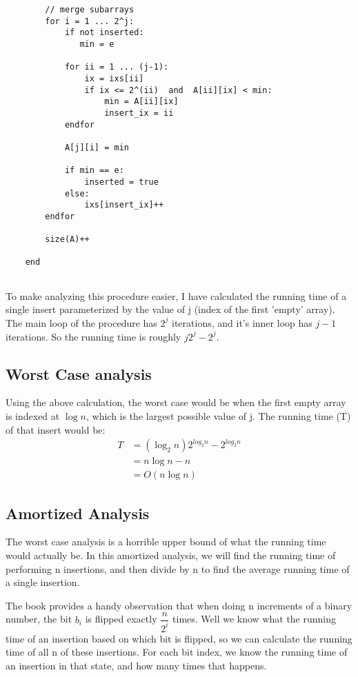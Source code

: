 \documentclass[a4paper,12pt]{article}
\begin{document}
\begin{enumerate}[a)]
\begin{verbatim}
        // merge subarrays 
        for i = 1 ... 2^j:
            if not inserted:
               min = e
           
            for ii = 1 ... (j-1):
                ix = ixs[ii] 
                if ix <= 2^(ii)  and  A[ii][ix] < min:
                    min = A[ii][ix]
                    insert_ix = ii
            endfor

            A[j][i] = min

            if min == e:
                inserted = true
            else:
                ixs[insert_ix]++
        endfor
        
        size(A)++
    
    end
        
  \end{verbatim}

  To make analyzing this procedure easier, I have calculated the running time of a
  single insert parameterized by the value of j (index of the first 'empty' array). 
  The main loop of the procedure has \(2^j\) iterations, and it's inner loop has \(j-1\) 
  iterations. So the running time is roughly \(j2^j - 2^j\).
  
  \subsection*{Worst Case analysis}

  Using the above calculation, the worst case would be when the first empty array
  is indexed at \(\log n\), which is the largest possible value of j. The running 
  time (T) of that insert would be:
  \begin{align*}
    T& = (\log_2 n)2^{log_2 n} - 2^{log_2 n}\\
    & = n\log n - n \\
    & = O(n\log n)
  \end{align*}

  \subsection*{Amortized Analysis}

  The worst case analysis is a horrible upper bound of what the running time would
  actually be. In this amortized analysis, we will find the running time of performing
  n insertions, and then divide by n to find the average running time of a single
  insertion.

  \noindent The book provides a handy observation that when doing n increments of a
  binary number, the bit \(b_i\) is flipped exactly \(\dfrac{n}{2^i} \)
  times. Well we know what the running time of an insertion based on which bit is 
  flipped, so we can calculate the running time of all n of these insertions. For
  each bit index, we know the running time of an insertion in that state, and how
  many times that happens.


\end{enumerate}
\end{document}
